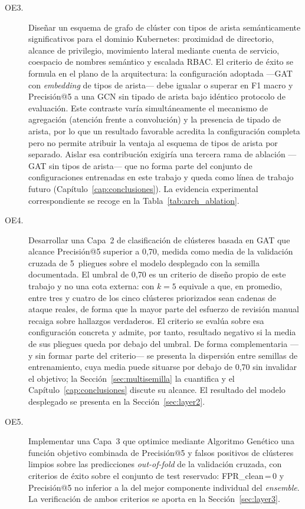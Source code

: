 \begin{description}
  \item[OE3.] Diseñar un esquema de grafo de clúster con tipos de arista
    semánticamente significativos para el dominio Kubernetes:
    proximidad de directorio, alcance de privilegio, movimiento lateral mediante
    cuenta de servicio, coespacio de nombres semántico y escalada \ac{RBAC}. El
    criterio de éxito se formula en el plano de la arquitectura: la configuración
    adoptada —\ac{GAT} con \textit{embedding} de tipos de arista— debe igualar o
    superar en F1 macro y Precisión@5 a una \ac{GCN} sin tipado de arista bajo
    idéntico protocolo de evaluación. Este contraste varía simultáneamente el
    mecanismo de agregación (atención frente a convolución) y la presencia de
    tipado de arista, por lo que un resultado favorable acredita la configuración
    completa pero no permite atribuir la ventaja al esquema de tipos de arista por
    separado. Aislar esa contribución exigiría una tercera rama de ablación —\ac{GAT}
    sin tipos de arista— que no forma parte del conjunto de configuraciones
    entrenadas en este trabajo y queda como línea de trabajo futuro
    (Capítulo~\ref{cap:conclusiones}). La evidencia experimental correspondiente se
    recoge en la Tabla~\ref{tab:arch_ablation}.

  \item[OE4.] Desarrollar una Capa~2 de clasificación de clústeres basada en \ac{GAT}
    que alcance Precisión@5 superior a 0,70, medida como media de la validación
    cruzada de 5~pliegues sobre el modelo desplegado con la semilla documentada.
    El umbral de 0,70 es un criterio de diseño propio de este trabajo y no una cota
    externa: con \(k=5\) equivale a que, en promedio, entre tres y cuatro de los cinco
    clústeres priorizados sean cadenas de ataque reales, de forma que la mayor parte
    del esfuerzo de revisión manual recaiga sobre hallazgos verdaderos.
    El criterio se evalúa sobre esa configuración concreta y admite, por tanto,
    resultado negativo si la media de sus pliegues queda por debajo del umbral.
    De forma complementaria —y sin formar parte del criterio— se presenta la
    dispersión entre semillas de entrenamiento, cuya media puede situarse por
    debajo de 0,70 sin invalidar el objetivo; la Sección~\ref{sec:multisemilla}
    la cuantifica y el Capítulo~\ref{cap:conclusiones} discute su alcance. El
    resultado del modelo desplegado se presenta en la Sección~\ref{sec:layer2}.

  \item[OE5.] Implementar una Capa~3 que optimice mediante Algoritmo Genético una
    función objetivo combinada de Precisión@5 y falsos positivos de clústeres
    limpios sobre las predicciones \textit{out-of-fold} de la validación cruzada,
    con criterios de éxito sobre el conjunto de test reservado:
    \ac{FPR}\_clean\,=\,0 y Precisión@5 no inferior a la del mejor componente
    individual del \textit{ensemble}. La verificación de ambos criterios se aporta
    en la Sección~\ref{sec:layer3}.


\end{description}

